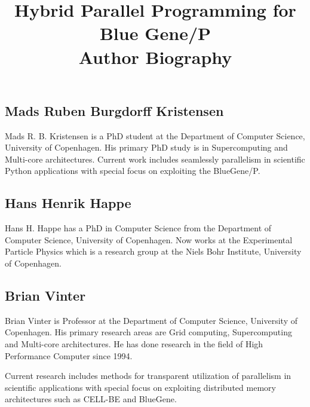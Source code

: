 \documentclass[a4paper,10pt]{article}
\title{Hybrid Parallel Programming for Blue Gene/P \\ Author Biography}
\date{}
\begin{document}
\maketitle

\subsection*{Mads Ruben Burgdorff Kristensen}
Mads R. B. Kristensen is a PhD student at the Department of Computer Science, University of Copenhagen. His primary PhD study is in Supercomputing and Multi-core architectures. Current work includes seamlessly parallelism in scientific Python applications with special focus on exploiting the BlueGene/P.


\subsection*{Hans Henrik Happe}
Hans H. Happe has a PhD in Computer Science from the Department of Computer Science, University of Copenhagen. Now works at the Experimental Particle Physics which is a research group at the Niels Bohr Institute, University of Copenhagen. 


\subsection*{Brian Vinter}
Brian Vinter is Professor at the Department of Computer Science, University of Copenhagen. His primary research areas are Grid computing, Supercomputing and Multi-core architectures. He has done research in the field of High Performance Computer since 1994.

Current research includes methods for transparent utilization of parallelism in scientific applications with special focus on exploiting distributed memory architectures such as CELL-BE and BlueGene.
\end{document}
